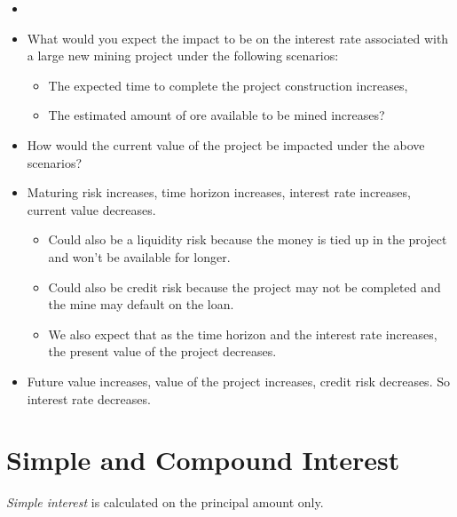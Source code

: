 \begin{example}
    \begin{itemize}
        \item[]
        \item What would you expect the impact to be on the interest rate associated with a large new mining project under the following scenarios:
              \begin{itemize}
                  \item The expected time to complete the project construction increases,
                  \item The estimated amount of ore available to be mined increases?
              \end{itemize}
        \item How would the current value of the project be impacted under the above scenarios?
    \end{itemize}
    \begin{itemize}
        \item Maturing risk increases, time horizon increases, interest rate increases, current value decreases.
              \begin{itemize}
                  \item Could also be a liquidity risk because the money is tied up in the project and won't be available for longer.
                  \item Could also be credit risk because the project may not be completed and the mine may default on the loan.
                  \item We also expect that as the time horizon and the interest rate increases, the present value of the project decreases.
              \end{itemize}
        \item Future value increases, value of the project increases, credit risk decreases. So interest rate decreases.
    \end{itemize}
\end{example}

\section{Simple and Compound Interest}

\begin{definition}
    \textit{Simple interest} is calculated on the principal amount only.
\end{definition}

